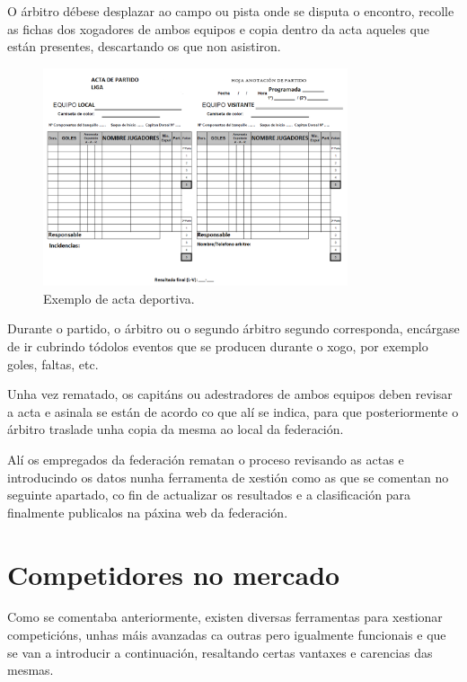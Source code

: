   O árbitro débese desplazar ao campo ou pista onde se disputa o encontro, 
recolle as fichas dos xogadores de ambos equipos e copia dentro da acta aqueles 
que están presentes, descartando os que non asistiron.

    \begin{figure}[h]
          \begin{center}
            \includegraphics[width=0.8\textwidth]{./img/acta.png}
            \caption{Exemplo de acta deportiva.}
            \label{fig:img:acta}
          \end{center}
    \end{figure}

  Durante o partido, o árbitro ou o segundo árbitro segundo corresponda, 
encárgase de ir cubrindo tódolos eventos que se producen durante o xogo, por 
exemplo goles, faltas, etc.

  Unha vez rematado, os capitáns ou adestradores de ambos equipos deben revisar 
a acta e asinala se están de acordo co que alí se indica, para que 
posteriormente o árbitro traslade unha copia da mesma ao local da federación.

  Alí os empregados da federación rematan o proceso revisando as actas e 
introducindo os datos nunha ferramenta de xestión como as que se comentan no 
seguinte apartado, co fin de actualizar os resultados e a clasificación para 
finalmente publicalos na páxina web da federación.

  \section{Competidores no mercado}
  Como se comentaba anteriormente, existen diversas ferramentas para xestionar 
competicións, unhas máis avanzadas ca outras pero igualmente funcionais e que 
se van a introducir a continuación, resaltando certas vantaxes e carencias 
das mesmas.

